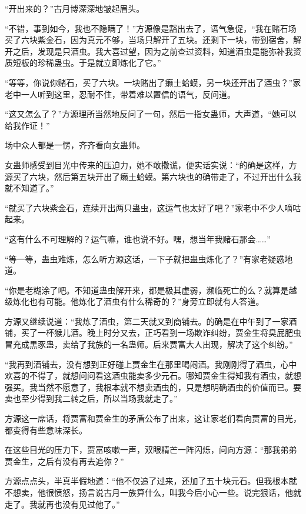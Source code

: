 
\begin{this_body}

“开出来的？”古月博深深地皱起眉头。

“不错，事到如今，我也不隐瞒了！”方源像是豁出去了，语气急促，“我在赌石场买了六块紫金石，因为真元不够，当场只解开了五块。还剩下一块，带到宿舍，解开之后，发现是只酒虫。我大喜过望，因为之前查过资料，知道酒虫是能弥补我资质短板的珍稀蛊虫。于是就立即炼化了它。”

“等等，你说你赌石，买了六块。一块赌出了癞土蛤蟆，另一块还开出了酒虫？”家老中一人听到这里，忍耐不住，带着难以置信的语气，反问道。

“这又怎么了？”方源理所当然地反问了一句，然后一指女蛊师，大声道，“她可以给我作证！”

场中众人都是一愣，齐齐看向女蛊师。

女蛊师感受到目光中传来的压迫力，她不敢撒谎，便实话实说：“的确是这样，方源买了六块，然后第五块开出了癞土蛤蟆。第六块也的确带走了，不过开出什么我就不知道了。”

“就买了六块紫金石，连续开出两只蛊虫，这运气也太好了吧？”家老中不少人嘀咕起来。

“这有什么不可理解的？运气嘛，谁也说不好。嘿，想当年我赌石那会……”

“等一等，蛊虫难炼，怎么听方源这话，一下子就把蛊虫炼化了？”有家老疑惑地道。

“你是老糊涂了吧。不知道蛊虫解开来，都是极其虚弱，濒临死亡的么？就算是越级炼化也有可能。他炼化了酒虫有什么稀奇的？”身旁立即就有人答道。

方源又继续说道：“我炼了酒虫，第二天就又到商铺去。的确是在中午到了一家酒铺，买了一杯猴儿酒。晚上时分又去，正巧看到一场欺诈纠纷，贾金生将臭屁肥虫冒充成黒豕蛊，卖给了我族的一名蛊师。后来贾富大人出现，解决了这个纠纷。”

“我再到酒铺去，没有想到正好碰上贾金生在那里喝闷酒。我刚刚得了酒虫，心中欢喜的不得了，就想问问看这酒虫能卖多少元石。哪知贾金生得知我有酒虫，就想强买。我当然不愿意了，我根本就不想卖酒虫的，只是想明确酒虫的价值而已。要卖也至少得到我二转之后，所以当场我就走了。”

方源这一席话，将贾富和贾金生的矛盾公布了出来，这让家老们看向贾富的目光，都变得有些意味深长。

在这些目光的压力下，贾富咳嗽一声，双眼精芒一阵闪烁，问向方源：“那我弟弟贾金生，之后有没有再去追你？”

方源点点头，半真半假地道：“他不仅追了过来，还加了五十块元石。但我根本就不想卖，他很愤怒，扬言说古月一族算什么，叫我今后小心一些。说完狠话，他就走了。我就再也没有见过他了。”


\end{this_body}
